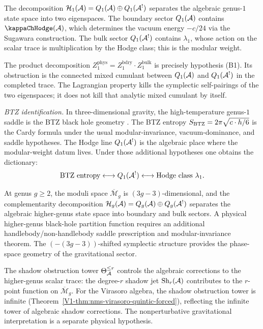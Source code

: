 \begin{remark}[Evidence]
The decomposition
$\mathcal{H}_1(\mathcal{A}) = Q_1(\mathcal{A}) \oplus Q_1(\mathcal{A}^!)$
separates the algebraic genus-$1$ state space into two eigenspaces.
The boundary sector $Q_1(\mathcal{A})$
contains $\kappaChHodge(\cA)$, which determines the vacuum energy
$-c/24$ via the Sugawara construction. The bulk sector
$Q_1(\mathcal{A}^!)$ contains $\lambda_1$, whose action on the
scalar trace is multiplication by the Hodge class;
this is the modular weight.

The product decomposition
\(Z_1^{\mathrm{phys}}=
Z_1^{\mathrm{bdry}}\cdot Z_1^{\mathrm{bulk}}\)
is precisely hypothesis \textup{(B1)}. Its obstruction is the connected
mixed cumulant between \(Q_1(\mathcal{A})\) and \(Q_1(\mathcal{A}^!)\) in the completed
trace. The Lagrangian property kills the symplectic self-pairings of
the two eigenspaces; it does not kill that analytic mixed cumulant by
itself.

\emph{BTZ identification.}
In three-dimensional gravity, the high-temperature genus-$1$ saddle is
the BTZ black hole geometry \cite{BTZ92, Maloney-Witten07}.
The BTZ entropy $S_{\mathrm{BTZ}} = 2\pi\sqrt{c \cdot h / 6}$
is the Cardy formula under the usual modular-invariance,
vacuum-dominance, and saddle hypotheses. The Hodge line
$Q_1(\mathcal{A}^!)$ is the algebraic place where the modular-weight datum
lives. Under those additional hypotheses one obtains the dictionary:
\[
\text{BTZ entropy} \longleftrightarrow Q_1(\mathcal{A}^!)
\longleftrightarrow \text{Hodge class } \lambda_1.
\]
\end{remark}

\begin{remark}
At genus $g \ge 2$, the moduli space
$\overline{\mathcal{M}}_g$ is $(3g-3)$-dimensional, and the
complementarity decomposition
$\mathcal{H}_g(\mathcal{A}) = Q_g(\mathcal{A}) \oplus Q_g(\mathcal{A}^!)$
separates the algebraic higher-genus state space into boundary
and bulk sectors. A physical higher-genus black-hole partition
function requires an additional handlebody/non-handlebody saddle
prescription and modular-invariance theorem. The $(-(3g-3))$-shifted
symplectic structure
provides the phase-space geometry of the gravitational sector.

The shadow obstruction tower $\Theta_{\mathcal{A}}^{\le r}$ controls the
algebraic corrections to the higher-genus scalar trace: the degree-$r$
shadow jet $\mathrm{Sh}_r(\mathcal{A})$ contributes
to the $r$-point function on $\overline{\mathcal{M}}_g$.
For the Virasoro algebra, the shadow obstruction tower is infinite
(Theorem~\ref{V1-thm:nms-virasoro-quintic-forced}), reflecting
the infinite tower of algebraic shadow corrections. The
nonperturbative gravitational interpretation is a separate physical
hypothesis.
\end{remark}

